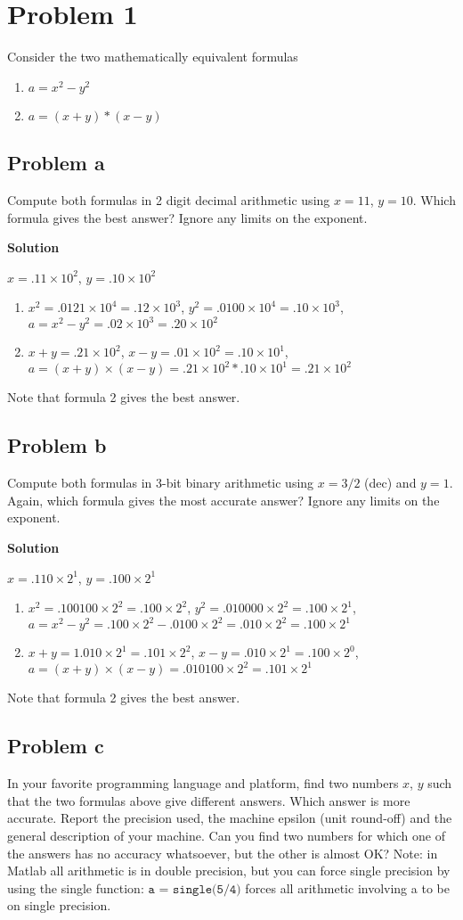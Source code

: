 \documentclass[12pt,oneside,a4paper]{article}
\title{\hmwkTitle}
\author{\hmwkAuthorName}
\date{\today}
\newcommand{\problem}[1]
{
    \clearpage
    \section*{Problem {#1}}
}
\newcommand{\subproblem}[1]
{
    \subsection*{Problem {#1}}
}
\newcommand{\solution}
{
    \vspace{15pt}
    \noindent\ignorespaces\textbf{\large Solution}\par
}
\newcommand{\m}[1]{\texttt{{#1}}}
\begin{document}
\maketitle


\problem{1}
Consider the two mathematically equivalent formulas
\begin{enumerate}
    \item $a = x^2 - y^2$
    \item $a = (x + y) * (x - y)$
\end{enumerate}

\subproblem{a}
Compute both formulas in 2 digit decimal arithmetic using $x = 11$, $y = 10$. Which formula gives the best answer? Ignore any limits on the exponent.

\solution
$x = .11\times 10^2$, $y = .10\times 10^2$
\begin{enumerate}
    \item $x ^ 2 = .0121 \times 10^4 = .12 \times 10^3$, $y^2 = .0100 \times 10^4 = .10 \times 10^3$, \\
    $a = x^2 - y^2 = .02 \times 10^3 = .20 \times 10^2$ 
    \item $x + y = .21 \times 10^2$, $x - y = .01 \times 10^2 = .10 \times 10^1$, \\
    $a = (x+y)\times(x-y) = .21 \times 10^2 * .10 \times 10^1 = .21 \times 10^2$
\end{enumerate}
Note that formula 2 gives the best answer.

\subproblem{b}
Compute both formulas in 3-bit binary arithmetic using $x = 3/2$ (dec) and $y = 1$. Again, which formula gives the most accurate answer? Ignore any limits on the exponent.

\solution
$x = .110 \times 2^1$, $y = .100 \times 2^1$
\begin{enumerate}
    \item $x^2 = .100100 \times 2^2 = .100 \times 2^2$, $y^2 = .010000 \times 2^2 = .100 \times 2^1$, \\
    $a = x^2 - y^2 = .100 \times 2^2 - .0100 \times 2^2 = .010 \times 2^2 = .100 \times 2^1$
    \item $x + y = 1.010 \times 2^1 = .101 \times 2^2$, $x - y = .010 \times 2^1 = .100 \times 2^0$, \\
    $a = (x + y) \times (x - y) = .010100 \times 2^2 = .101 \times 2^1$
\end{enumerate}
Note that formula 2 gives the best answer.

\subproblem{c}
In your favorite programming language and platform, find two numbers $x$, $y$ such that the two formulas above give different answers. Which answer is more accurate. Report the precision used, the machine epsilon (unit round-off) and the general description of your machine. Can you find two numbers for which one of the answers has no accuracy whatsoever, but the other is almost OK? Note: in Matlab all arithmetic is in double precision, but you can force single precision by using the single function: $\m{a = single(5/4)}$ forces all arithmetic involving a to be on single precision.
\end{document}
